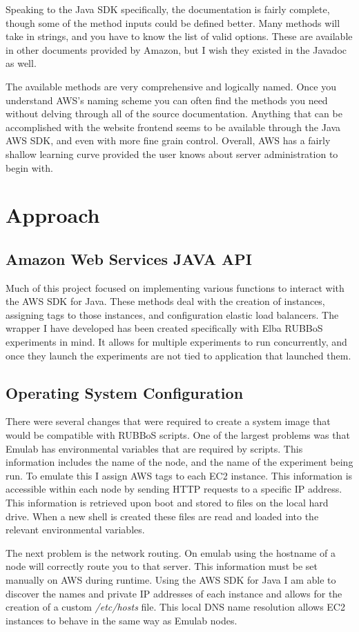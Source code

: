\documentclass{article}
\begin{document}
Speaking to the Java SDK specifically, the documentation is fairly complete, though some of the method inputs could be defined better. Many methods will take in strings, and you have to know the list of valid options. These are available in other documents provided by Amazon, but I wish they existed in the Javadoc as well.

The available methods are very comprehensive and logically named. Once you understand AWS's naming scheme you can often find the methods you need without delving through all of the source documentation. Anything that can be accomplished with the website frontend seems to be available through the Java AWS SDK, and even with more fine grain control. Overall, AWS has a fairly shallow learning curve provided the user knows about server administration to begin with.
\section{Approach}
\subsection{Amazon Web Services JAVA API}
Much of this project focused on implementing various functions to interact with  the AWS SDK for Java. These methods deal with the creation of instances, assigning tags to those instances, and configuration elastic load balancers. The wrapper I have developed has been created specifically with Elba RUBBoS experiments in mind. It allows for multiple experiments to run concurrently, and once they launch the experiments are not tied to application that launched them.
\subsection{Operating System Configuration}
There were several changes that were required to create a system image that would be compatible with RUBBoS scripts. One of the largest problems was that Emulab has environmental variables that are required by scripts. This information includes the name of the node, and the name of the experiment being run. To emulate this I assign AWS tags to each EC2 instance. This information is accessible within each node by sending HTTP requests to a specific IP address\cite{metaDataRetr}.
This information is retrieved upon boot and stored to files on the local hard drive. When a new shell is created these files are read and loaded into the relevant environmental variables.

The next problem is the network routing. On emulab using the hostname of a node will correctly route you to that server. This information must be set manually on AWS during runtime. Using the AWS SDK for Java I am able to discover the names and private IP addresses of each instance and allows for the creation of a custom {\it/etc/hosts} file. This local DNS name resolution allows EC2 instances to behave in the same way as Emulab nodes.
\end{document}
